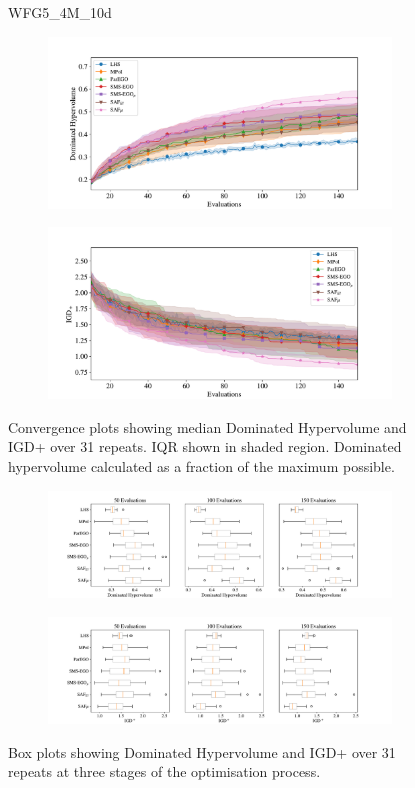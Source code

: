 \documentclass[conference]{IEEEtran}
\begin{document}
\begin{figure}
WFG5\_4M\_10d


\begin{subfigure}[hbt!]{\linewidth}

    \centering
    \includegraphics[width=0.7\linewidth]{figures/wfg5_4obj_10dim_hv_plot.pdf}
\end{subfigure}
\begin{subfigure}[h]{\linewidth}
    \centering
    \includegraphics[width=0.7\linewidth]{figures/wfg5_4obj_10dim_igd_plot.pdf}
\end{subfigure}
    \caption{Convergence plots showing median Dominated Hypervolume and IGD+ over 31 repeats. IQR shown in shaded region. Dominated hypervolume calculated as a fraction of the maximum possible.}
\vspace{\floatsep}
\begin{subfigure}[t]{\linewidth}
    \centering
    \includegraphics[width=0.8\linewidth]{figures/wfg5_4obj_10dim_hv_boxplot.pdf}
\end{subfigure}
\begin{subfigure}[t]{\linewidth}
    \centering
    \includegraphics[width=0.8\linewidth]{figures/wfg5_4obj_10dim_igd_boxplot.pdf}
\end{subfigure}
    \caption{Box plots showing Dominated Hypervolume and IGD+ over 31 repeats at three stages of the optimisation process.}
\end{figure}
\clearpage
\end{document}
